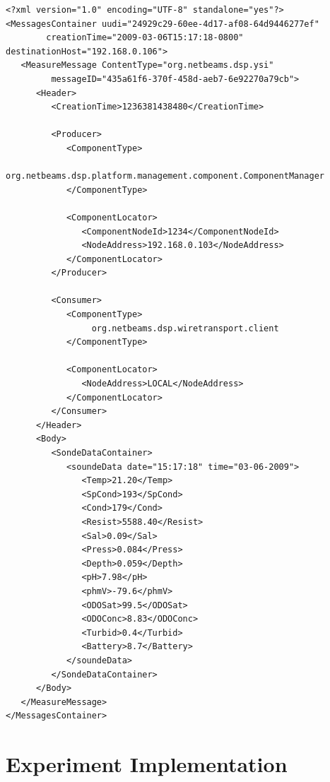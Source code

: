 

\begin{lstlisting}
<?xml version="1.0" encoding="UTF-8" standalone="yes"?>
<MessagesContainer uudi="24929c29-60ee-4d17-af08-64d9446277ef"
        creationTime="2009-03-06T15:17:18-0800" destinationHost="192.168.0.106">
   <MeasureMessage ContentType="org.netbeams.dsp.ysi"
         messageID="435a61f6-370f-458d-aeb7-6e92270a79cb">
      <Header>
         <CreationTime>1236381438480</CreationTime>
         
         <Producer>   
            <ComponentType>
                 org.netbeams.dsp.platform.management.component.ComponentManager
            </ComponentType>
            
            <ComponentLocator>
               <ComponentNodeId>1234</ComponentNodeId>
               <NodeAddress>192.168.0.103</NodeAddress>
            </ComponentLocator>
         </Producer>
         
         <Consumer>
            <ComponentType>
                 org.netbeams.dsp.wiretransport.client
            </ComponentType>
            
            <ComponentLocator>
               <NodeAddress>LOCAL</NodeAddress>
            </ComponentLocator>
         </Consumer>
      </Header>
      <Body>
         <SondeDataContainer>
            <soundeData date="15:17:18" time="03-06-2009">  
               <Temp>21.20</Temp>
               <SpCond>193</SpCond>
               <Cond>179</Cond>
               <Resist>5588.40</Resist>
               <Sal>0.09</Sal>
               <Press>0.084</Press>
               <Depth>0.059</Depth>
               <pH>7.98</pH>
               <phmV>-79.6</phmV>
               <ODOSat>99.5</ODOSat>
               <ODOConc>8.83</ODOConc>
               <Turbid>0.4</Turbid>
               <Battery>8.7</Battery>
            </soundeData>
         </SondeDataContainer>
      </Body>
   </MeasureMessage>
</MessagesContainer>
\end{lstlisting}

\section{Experiment Implementation}

